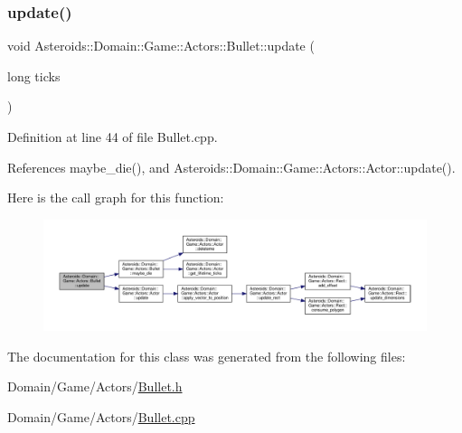 \subsubsection{\texorpdfstring{update()}{update()}}
{\footnotesize\ttfamily void Asteroids\+::\+Domain\+::\+Game\+::\+Actors\+::\+Bullet\+::update (\begin{DoxyParamCaption}\item[{long}]{ticks }\end{DoxyParamCaption})}



Definition at line 44 of file Bullet.\+cpp.



References maybe\+\_\+die(), and Asteroids\+::\+Domain\+::\+Game\+::\+Actors\+::\+Actor\+::update().

Here is the call graph for this function\+:\nopagebreak
\begin{figure}[H]
\begin{center}
\leavevmode
\includegraphics[width=350pt]{classAsteroids_1_1Domain_1_1Game_1_1Actors_1_1Bullet_a06eb5b7aa30c8547159696c82fd2f642_cgraph}
\end{center}
\end{figure}


The documentation for this class was generated from the following files\+:\begin{DoxyCompactItemize}
\item 
Domain/\+Game/\+Actors/\hyperlink{Bullet_8h}{Bullet.\+h}\item 
Domain/\+Game/\+Actors/\hyperlink{Bullet_8cpp}{Bullet.\+cpp}\end{DoxyCompactItemize}
